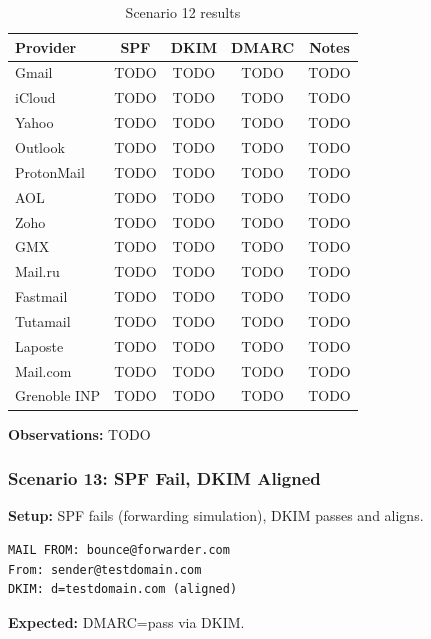 \documentclass[11pt,a4paper]{article}
\begin{document}
\begin{table}[h]
\centering
\small
\begin{tabular}{lcccc}
\toprule
\textbf{Provider} & \textbf{SPF} & \textbf{DKIM} & \textbf{DMARC} & \textbf{Notes} \\
\midrule
Gmail & TODO & TODO & TODO & TODO \\
iCloud & TODO & TODO & TODO & TODO \\
Yahoo & TODO & TODO & TODO & TODO \\
Outlook & TODO & TODO & TODO & TODO \\
ProtonMail & TODO & TODO & TODO & TODO \\
AOL & TODO & TODO & TODO & TODO \\
Zoho & TODO & TODO & TODO & TODO \\
GMX & TODO & TODO & TODO & TODO \\
Mail.ru & TODO & TODO & TODO & TODO \\
Fastmail & TODO & TODO & TODO & TODO \\
Tutamail & TODO & TODO & TODO & TODO \\
Laposte & TODO & TODO & TODO & TODO \\
Mail.com & TODO & TODO & TODO & TODO \\
Grenoble INP & TODO & TODO & TODO & TODO \\
\bottomrule
\end{tabular}
\caption{Scenario 12 results}
\end{table}

\textbf{Observations:} TODO


\subsubsection{Scenario 13: SPF Fail, DKIM Aligned}

\textbf{Setup:} SPF fails (forwarding simulation), DKIM passes and aligns.

\begin{lstlisting}
MAIL FROM: bounce@forwarder.com
From: sender@testdomain.com
DKIM: d=testdomain.com (aligned)
\end{lstlisting}

\textbf{Expected:} DMARC=pass via DKIM.
\end{document}
